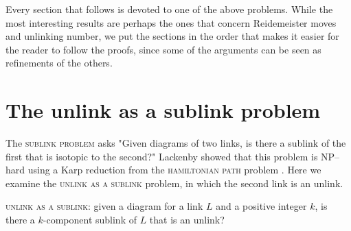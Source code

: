 \documentclass[12pt]{amsart}
\theoremstyle{definition}
\theoremstyle{remark}
\begin{document}
Every section that follows is devoted to one of the above problems. While the most interesting results are perhaps the ones that concern Reidemeister moves and unlinking number, we put the sections in the order that makes it easier for the reader to follow the proofs, since some of the arguments can be seen as refinements of the others.

\section{The unlink as a sublink problem}
\label{sec_unlinksublink}

The \textsc{sublink problem} asks "Given diagrams of two links, is there a sublink of the first that is isotopic to the second?"  Lackenby showed that this problem is NP--hard using a Karp reduction from the \textsc{hamiltonian path} problem \cite{Lackenby1}. Here we examine the \textsc{unlink as a sublink} problem, in which the second link is an unlink.

\vspace{0.14in}

\textsc{unlink as a sublink}: given a diagram for a link $L$ and a positive integer $k$, is there a $k$-component sublink of $L$ that is an unlink?
\end{document}
